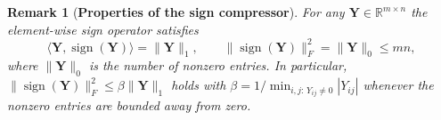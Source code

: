 \documentclass[letterpaper]{article} %
\newtheorem{assumption}{Assumption}
\newtheorem{remark}{Remark}
\begin{document}


\begin{remark}[\textbf{Properties of the sign compressor}]\label{lem:sign}
For any $\mathbf{Y} \in \mathbb{R}^{m \times n}$ the element-wise sign operator satisfies
\begin{equation}
\langle \mathbf{Y}, \operatorname{sign}(\mathbf{Y}) \rangle = \|\mathbf{Y}\|_1,
\qquad
\|\operatorname{sign}(\mathbf{Y})\|_F^2 = \|\mathbf{Y}\|_0 \le mn,
\end{equation}
where $\|\mathbf{Y}\|_0$ is the number of nonzero entries. In particular,
$\|\operatorname{sign}(\mathbf{Y})\|_F^2 \le \beta \|\mathbf{Y}\|_1$ holds with
$\beta = 1/\min_{i,j:\,Y_{ij}\neq 0}|Y_{ij}|$ whenever the nonzero entries are bounded away from zero.
\end{remark}
\end{document}
